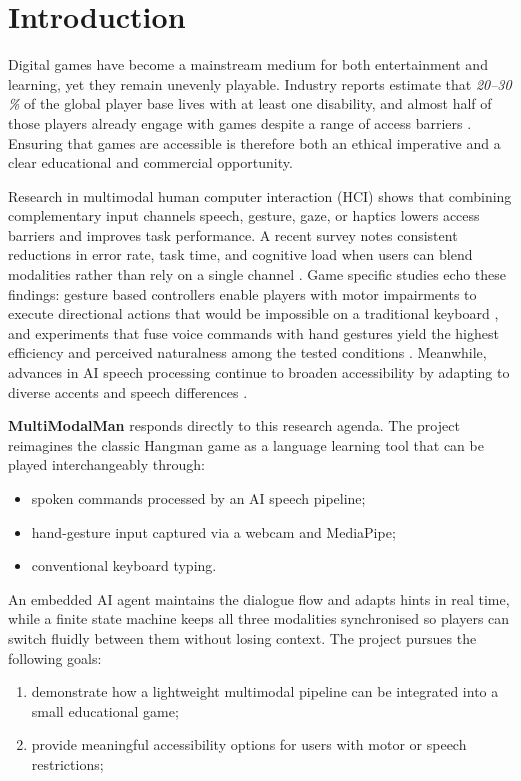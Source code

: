\section{Introduction}
Digital games have become a mainstream medium for both entertainment and learning, yet they remain unevenly playable. Industry reports estimate that \emph{20–30 \%} of the global player base lives with at least one disability, and almost half of those players already engage with games despite a range of access barriers \cite{ablegamers2024}. Ensuring that games are accessible is therefore both an ethical imperative and a clear educational and commercial opportunity.

Research in multimodal human computer interaction (HCI) shows that combining complementary input channels speech, gesture, gaze, or haptics lowers access barriers and improves task performance. A recent survey notes consistent reductions in error rate, task time, and cognitive load when users can blend modalities rather than rely on a single channel \cite{baig2020}. Game specific studies echo these findings: gesture based controllers enable players with motor impairments to execute directional actions that would be impossible on a traditional keyboard \cite{taheri2021}, and experiments that fuse voice commands with hand gestures yield the highest efficiency and perceived naturalness among the tested conditions \cite{cao2023}. Meanwhile, advances in AI speech processing continue to broaden accessibility by adapting to diverse accents and speech differences \cite{morris2019}.

\textbf{MultiModalMan} responds directly to this research agenda. The project reimagines the classic Hangman game as a language learning tool that can be played interchangeably through:

\begin{itemize}
  \item spoken commands processed by an AI speech pipeline;
  \item hand-gesture input captured via a webcam and MediaPipe;
  \item conventional keyboard typing.
\end{itemize}

An embedded AI agent maintains the dialogue flow and adapts hints in real time, while a finite state machine keeps all three modalities synchronised so players can switch fluidly between them without losing context. The project pursues the following goals:

\begin{enumerate}
  \item demonstrate how a lightweight multimodal pipeline can be integrated into a small educational game;
  \item provide meaningful accessibility options for users with motor or speech restrictions;
\end{enumerate}
